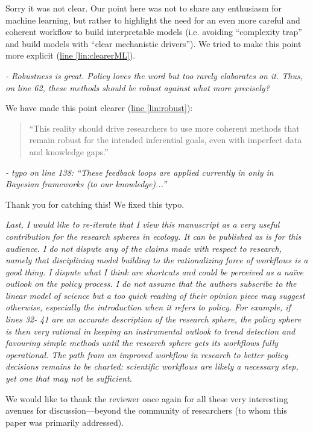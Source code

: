 \documentclass[11pt,letter]{article}
\begin{document}
Sorry it was not clear. Our point here was not to share any enthusiasm for machine learning, but rather to highlight the need for an even more careful and coherent workflow to build interpretable models (i.e. avoiding  ``complexity trap'' and build models with ``clear mechanistic drivers''). We tried to make this point more explicit  (\href{file:forecastflows_r2\#lintarget:clearerML}{line \ref*{lin:clearerML}}).

\begin{mybox}
\emph{- Robustness is great. Policy loves the word but too rarely elaborates on it. Thus, on line 62,
these methods should be robust against what more precisely?}  
\end{mybox}

We have made this point clearer (\href{file:forecastflows_r2\#lintarget:robust}{line \ref*{lin:robust}}):
\begin{quote}
``This reality should drive researchers to use more coherent methods that remain robust for the intended inferential goals, even with imperfect data and knowledge gaps.''
\end{quote}

\begin{mybox}
\emph{- typo on line 138: “These feedback loops are applied currently in only in Bayesian
frameworks (to our knowledge)...”}
\end{mybox}

Thank you for catching this! We fixed this typo.

\begin{mybox}
\emph{Last, I would like to re-iterate that I view this manuscript as a very useful contribution for the
research spheres in ecology. It can be published as is for this audience. I do not dispute any of
the claims made with respect to research, namely that disciplining model building to the
rationalizing force of workflows is a good thing. I dispute what I think are shortcuts and could
be perceived as a naïve outlook on the policy process. I do not assume that the authors
subscribe to the linear model of science but a too quick reading of their opinion piece may
suggest otherwise, especially the introduction when it refers to policy. For example, if lines 32-
41 are an accurate description of the research sphere, the policy sphere is then very rational in
keeping an instrumental outlook to trend detection and favouring simple methods until the
research sphere gets its workflows fully operational. The path from an improved workflow in
research to better policy decisions remains to be charted: scientific workflows are likely a
necessary step, yet one that may not be sufficient.}
\end{mybox}

We would like to thank the reviewer once again for all these very interesting avenues for discussion---beyond the community of researchers (to whom this paper was primarily addressed).
\end{document}
